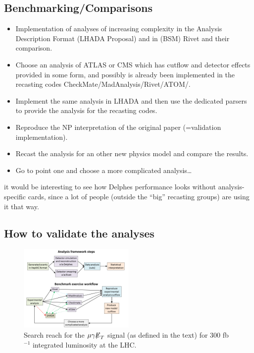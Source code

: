 \documentclass[11pt]{cernrep}
\begin{document}
\subsection{Benchmarking/Comparisons}

\begin{itemize}
\item Implementation of analyses of increasing complexity in the Analysis Description Format (LHADA Proposal) and in (BSM) Rivet and their comparison.
\item Choose an analysis of ATLAS or CMS which has cutflow and detector effects provided in some form, and possibly is already been implemented in the recasting codes CheckMate/MadAnalysis/Rivet/ATOM/.
\item Implement the same analysis in LHADA and then use the dedicated parsers to provide the analysis for the recasting codes.
\item Reproduce the NP interpretation of the original paper (=validation implementation).
\item Recast the analysis for an other new physics model and compare the results.
\item Go to point one and choose a more complicated analysis…
\end{itemize}
it would be interesting to see how Delphes performance looks without analysis-specific cards, since a lot of people (outside the “big” recasting groups) are using it that way.

\subsection{How to validate the analyses}
\begin{figure}
\begin{center}
\includegraphics[width=0.5\textwidth]{figures/lhada_benchmarking_excersise.png}
 \caption{Search reach for the $\mu \gamma {\not\!\!E}_{T}$ signal
(as defined in the
   text) for
   300 fb$^{-1}$ integrated luminosity  at the LHC.
}
\label{search}
\end{center}
\end{figure}
\end{document}
